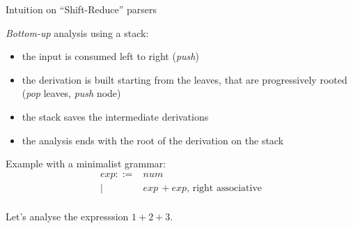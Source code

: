 \documentclass{beamer}          %
\begin{document}
\begin{frame}{Intuition on ``Shift-Reduce'' parsers}

  {\em Bottom-up} analysis using a stack:

  \begin{itemize}
    \item the input is consumed left to right ({\em push})
    \item the derivation is built starting from the leaves,
          that are progressively rooted ({\em pop} leaves, {\em push} node)
    \item the stack saves the intermediate derivations
    \item the analysis ends with the root of the derivation on the stack
  \end{itemize}

  \pause

  Example with a minimalist grammar:
  $$
  \begin{array}{rl}
    exp ::= & num \\
          | & exp\,+ exp \text{, right associative}\\
  \end{array}
  $$

  Let's analyse the expresssion $1+2+3$.
\end{frame}
\end{document}
